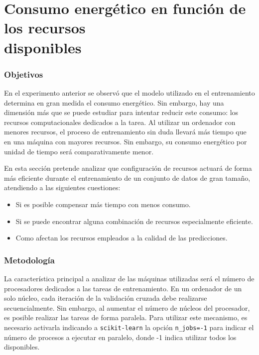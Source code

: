 

\section{Consumo energético en función de los recursos\\ disponibles}
\label{sec:test-2-resources}

\subsubsection{Objetivos}

 En el experimento anterior se observó que el modelo utilizado en el entrenamiento determina en gran medida el consumo energético. Sin embargo, hay una dimensión más que se puede estudiar para intentar reducir este consumo: los recursos computacionales dedicados a la tarea. Al utilizar un ordenador con menores recursos, el proceso de entrenamiento sin duda llevará más tiempo que en una máquina con mayores recursos. Sin embargo, su consumo energético por unidad de tiempo será comparativamente menor.
 
 En esta sección pretende analizar que configuración de recursos actuará de forma más eficiente durante el entrenamiento de un conjunto de datos de gran tamaño, atendiendo a las siguientes cuestiones:

 \begin{itemize}
    \item Si es posible compensar más tiempo con menos consumo.
    \item Si se puede encontrar alguna combinación de recursos especialmente eficiente.
    \item Como afectan los recursos empleados a la calidad de las predicciones.
\end{itemize}

\subsubsection{Metodología}

La característica principal a analizar de las máquinas utilizadas será el número de procesadores dedicados a las tareas de entrenamiento. En un ordenador de un solo núcleo, cada iteración de la validación cruzada debe realizarse secuencialmente. Sin embargo, al aumentar el número de núcleos del procesador, es posible realizar las tareas de forma paralela. Para utilizar este mecanismo, es necesario activarla indicando a \texttt{scikit-learn} la opción \texttt{n\_jobs=-1} para indicar el número de procesos a ejecutar en paralelo, donde -1 indica utilizar todos los disponibles.

